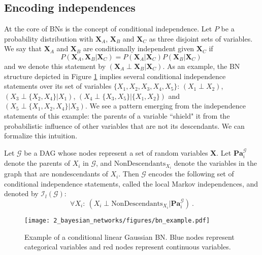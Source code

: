 \subsection{Encoding independences}
At the core of BNs is the concept of conditional independence. Let $P$ be a probability distribution with $\mathbf{X}_{A}$, $\mathbf{X}_{B}$ and $\mathbf{X}_{C}$ as three disjoint sets of variables. We say that $\mathbf{X}_{A}$ and $\mathbf{X}_{B}$ are conditionally independent given $\mathbf{X}_{C}$ if
\begin{equation*}
P(\mathbf{X}_{A}, \mathbf{X}_{B} | \mathbf{X}_{C}) = P(\mathbf{X}_{A} | \mathbf{X}_{C}) P (\mathbf{X}_{B} | \mathbf{X}_{C}) \ 
\end{equation*}
and we denote this statement by $(\mathbf{X}_{A} \perp \mathbf{X}_{B} | \mathbf{X}_{C})$. As an example, the BN structure depicted in Figure \ref{fig:2_bn_example} implies several conditional independence statements over its set of variables $\{X_{1}, X_{2}, X_{3}, X_{4}, X_{5}\}$: $(X_{1} \perp X_{2})$, $(X_{3} \perp \{X_{2}, X_{4}\} | X_{1})$, $(X_{4} \perp \{X_{3}, X_{5}\}| \{X_{1}, X_{2}\})$ and $(X_{5} \perp \{X_{1}, X_{2}, X_{4}\} | X_{3})$. We see a pattern emerging from the independence statements of this example: the parents of a variable ``shield" it from the probabilistic influence of other variables that are not its descendants. We can formalize this intuition. 

Let $\mathcal{G}$ be a DAG whose nodes represent a set of random variables $\mathbf{X}$. Let $\mathbf{Pa}_{i}^{\mathcal{G}}$ denote the parents of $X_{i}$ in $\mathcal{G}$, and $\text{NonDescendants}_{X_{i}}$ denote the variables in the graph that are nondescendants of $X_{i}$. Then $\mathcal{G}$ encodes the following set of conditional independence statements, called the local Markov independences, and denoted by $\mathcal{I}_{l}(\mathcal{G})$:
\begin{equation*}
\forall X_{i} : \ (X_{i} \perp \text{NonDescendants}_{X_{i}} | \mathbf{Pa}_{i}^{\mathcal{G}}) \ .
\end{equation*}

\begin{figure}[t!]
	\begin{center}
		\texttt{[image: 2\_bayesian\_networks/figures/bn\_example.pdf]}
		\caption{Example of a conditional linear Gaussian BN. Blue nodes represent categorical variables and red nodes represent continuous variables.}
		\label{fig:2_bn_example}
	\end{center}
\end{figure}

